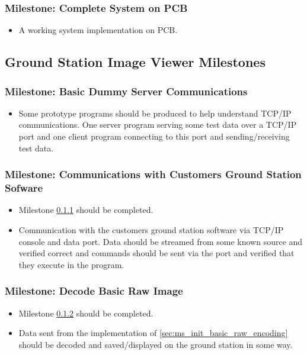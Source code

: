 	\subsubsection{Milestone: Complete System on PCB}
		\begin{itemize}
			\item A working system implementation on PCB.
		\end{itemize}


\subsection{Ground Station Image Viewer Milestones}
	\subsubsection{Milestone: Basic Dummy Server Communications}
		\label{sec:ms_init_basic_dummy_server_comms}
		\begin{itemize}
			\item 	Some prototype programs should be produced to help understand TCP/IP communications.
				One server program serving some test data over a TCP/IP port and one
				client program connecting to this port and sending/receiving test data.
		\end{itemize}

	\subsubsection{Milestone: Communications with Customers Ground Station Sofware}
		\label{sec:ms_init_basestation_comms}
		\begin{itemize}
			\item 	Milestone \ref{sec:ms_init_basic_dummy_server_comms} should be
				completed.
			\item 	Communication with the customers ground station software via TCP/IP console and
				data port. Data should be streamed from some known source and verified correct and
				commands should be sent via the port and verified that they execute in the program.
		\end{itemize}

	\subsubsection{Milestone: Decode Basic Raw Image}
		\label{sec:ms_init_decode_basic_raw_image}
		\begin{itemize}
			\item 	Milestone \ref{sec:ms_init_basestation_comms} should be completed.
			\item 	Data sent from the implementation of \ref{sec:ms_init_basic_raw_encoding} should be
				decoded and saved/displayed on the ground station in some way.
		\end{itemize}

